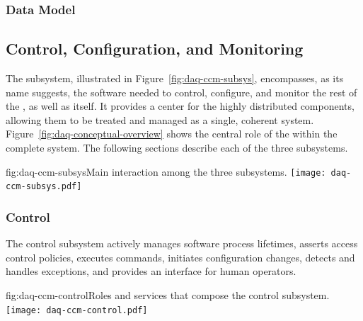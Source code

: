 \subsubsection{Data Model}
\label{sec:daq:design-data-model}




\subsection{Control, Configuration, and Monitoring}
\label{sec:daq:design-run-control}

The  subsystem, illustrated in Figure~\ref{fig:daq-ccm-subsys},
encompasses, as its name suggests, the software needed to control, configure,
and monitor the rest of the , as well as itself. 
It provides a center for the highly distributed  components, allowing
them to be treated and managed as a single, coherent system. 
Figure~\ref{fig:daq-conceptual-overview} shows the central role of the
 within the complete  system.
The following sections describe each of the three  subsystems. 

\begin{dunefigure}{fig:daq-ccm-subsys}{Main interaction among the three  subsystems.}
  \texttt{[image: daq-ccm-subsys.pdf]}
\end{dunefigure}

\subsubsection{Control}
\label{sec:daq:design:ccm:control}


The  control subsystem actively manages  software process
lifetimes, asserts access control policies, executes commands, initiates
configuration changes, detects and handles exceptions, and provides an interface
for human operators.

\begin{dunefigure}{fig:daq-ccm-control}{Roles and services that compose the  control subsystem.}
  \texttt{[image: daq-ccm-control.pdf]}
\end{dunefigure}

